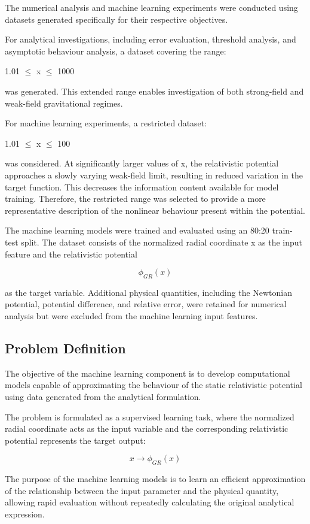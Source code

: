 \documentclass[
]{article}
\begin{document}
The numerical analysis and machine learning experiments were conducted
using datasets generated specifically for their respective objectives.

For analytical investigations, including error evaluation, threshold
analysis, and asymptotic behaviour analysis, a dataset covering the range:

1.01 $\leq$ x $\leq$ 1000

was generated. This extended range enables investigation of both
strong-field and weak-field gravitational regimes.

For machine learning experiments, a restricted dataset:

1.01 $\leq$ x $\leq$ 100

was considered. At significantly larger values of x, the relativistic
potential approaches a slowly varying weak-field limit, resulting in
reduced variation in the target function. This decreases the information
content available for model training. Therefore, the restricted range
was selected to provide a more representative description of the
nonlinear behaviour present within the potential.

The machine learning models were trained and evaluated using an 80:20
train-test split. The dataset consists of the normalized radial
coordinate x as the input feature and the relativistic potential

\[
\phi_{GR}(x)
\]

as the target variable. Additional physical quantities, including the
Newtonian potential, potential difference, and relative error, were
retained for numerical analysis but were excluded from the machine
learning input features.

\subsection{ Problem Definition}\label{problem-definition}

The objective of the machine learning component is to develop
computational models capable of approximating the behaviour of the
static relativistic potential using data generated from the analytical
formulation.

The problem is formulated as a supervised learning task, where the
normalized radial coordinate acts as the input variable and the
corresponding relativistic potential represents the target output:

\[
x \rightarrow \phi_{GR}(x)
\]

The purpose of the machine learning models is to learn an efficient
approximation of the relationship between the input parameter and the
physical quantity, allowing rapid evaluation without repeatedly
calculating the original analytical expression.
\end{document}
